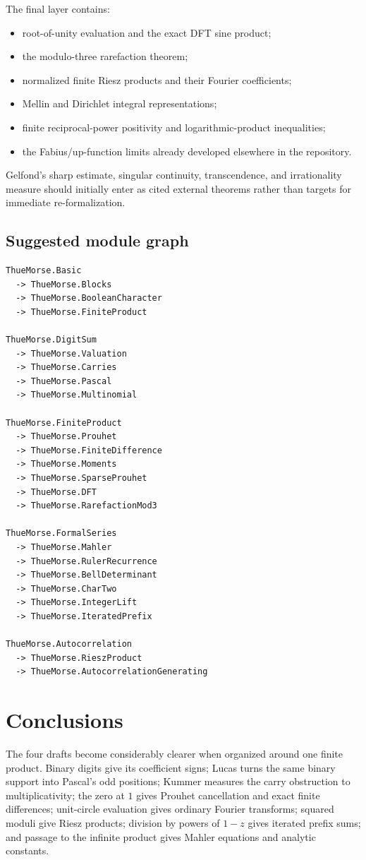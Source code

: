 \documentclass[11pt,oneside]{article}
\theoremstyle{definition}
\theoremstyle{remark}
\begin{document}
The final layer contains:
\begin{itemize}
 \item root-of-unity evaluation and the exact DFT sine product;
 \item the modulo-three rarefaction theorem;
 \item normalized finite Riesz products and their Fourier coefficients;
 \item Mellin and Dirichlet integral representations;
 \item finite reciprocal-power positivity and logarithmic-product inequalities;
 \item the Fabius/up-function limits already developed elsewhere in the
       repository.
\end{itemize}
Gelfond's sharp estimate, singular continuity, transcendence, and irrationality
measure should initially enter as cited external theorems rather than targets
for immediate re-formalization.

\subsection{Suggested module graph}

\begin{lstlisting}[style=pseudo,caption={Possible Lean module decomposition}]
ThueMorse.Basic
  -> ThueMorse.Blocks
  -> ThueMorse.BooleanCharacter
  -> ThueMorse.FiniteProduct

ThueMorse.DigitSum
  -> ThueMorse.Valuation
  -> ThueMorse.Carries
  -> ThueMorse.Pascal
  -> ThueMorse.Multinomial

ThueMorse.FiniteProduct
  -> ThueMorse.Prouhet
  -> ThueMorse.FiniteDifference
  -> ThueMorse.Moments
  -> ThueMorse.SparseProuhet
  -> ThueMorse.DFT
  -> ThueMorse.RarefactionMod3

ThueMorse.FormalSeries
  -> ThueMorse.Mahler
  -> ThueMorse.RulerRecurrence
  -> ThueMorse.BellDeterminant
  -> ThueMorse.CharTwo
  -> ThueMorse.IntegerLift
  -> ThueMorse.IteratedPrefix

ThueMorse.Autocorrelation
  -> ThueMorse.RieszProduct
  -> ThueMorse.AutocorrelationGenerating
\end{lstlisting}

\section{Conclusions}

The four drafts become considerably clearer when organized around one finite
product.  Binary digits give its coefficient signs; Lucas turns the same binary
support into Pascal's odd positions; Kummer measures the carry obstruction to
multiplicativity; the zero at $1$ gives Prouhet cancellation and exact finite
differences; unit-circle evaluation gives ordinary Fourier transforms; squared
moduli give Riesz products; division by powers of $1-z$ gives iterated prefix
sums; and passage to the infinite product gives Mahler equations and analytic
constants.
\end{document}
